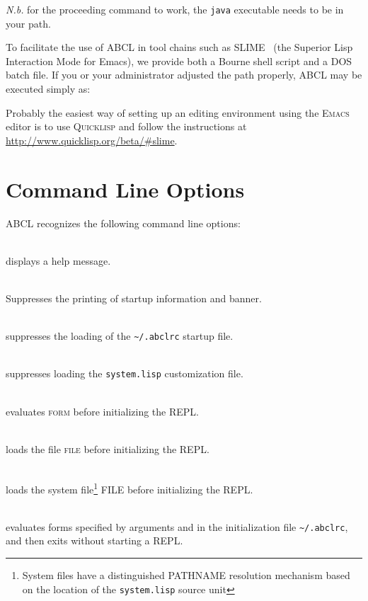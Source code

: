 \documentclass[10pt]{book}
\begin{document}
\emph{N.b.} for the proceeding command to work, the \texttt{java}
executable needs to be in your path.

To facilitate the use of ABCL in tool chains such as SLIME~\cite{slime}
(the Superior Lisp Interaction Mode for Emacs), we provide both a Bourne
shell script and a \textsc{DOS} batch file.  If you or your
administrator adjusted the path properly, ABCL may be executed simply
as:


Probably the easiest way of setting up an editing environment using the
\textsc{Emacs} editor is to use \textsc{Quicklisp} and follow the instructions at
\url{http://www.quicklisp.org/beta/#slime}.

\section{Command Line Options}

ABCL recognizes the following command line options:


\begin{description}
\item {} \\
  displays a help message.
\item {} \\
  Suppresses the printing of startup information and banner.
\item {} \\
  suppresses the loading of the \verb+~/.abclrc+ startup file.
\item {} \\
  suppresses loading the \texttt{system.lisp} customization file. 
\item {} \\
  evaluates \textsc{form} before initializing the REPL.
\item {} \\
  loads the file \textsc{file} before initializing the REPL.
\item {} \\ loads the system
  file\footnote{System files have a distinguished PATHNAME resolution
  mechanism based on the location of the \texttt{system.lisp} source
  unit} FILE before initializing the REPL.
\item {}  \\evaluates forms specified by arguments and in
  the initialization file \verb+~/.abclrc+, and then exits without
  starting a \textsc{REPL}.
\end{description}
\end{document}
